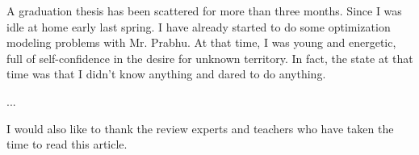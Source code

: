 \begin{Acknowledgement}

    A graduation thesis has been scattered for more than three months. 
    Since I was idle at home early last spring. 
    I have already started to do some optimization modeling problems with Mr. Prabhu. At that time, I was young and energetic, full of self-confidence in the desire for unknown territory. 
    In fact, the state at that time was that I didn't know anything and dared to do anything. 
    
    ...
    
    I would also like to thank the review experts and teachers who have taken the time to read this article.
    
\end{Acknowledgement}